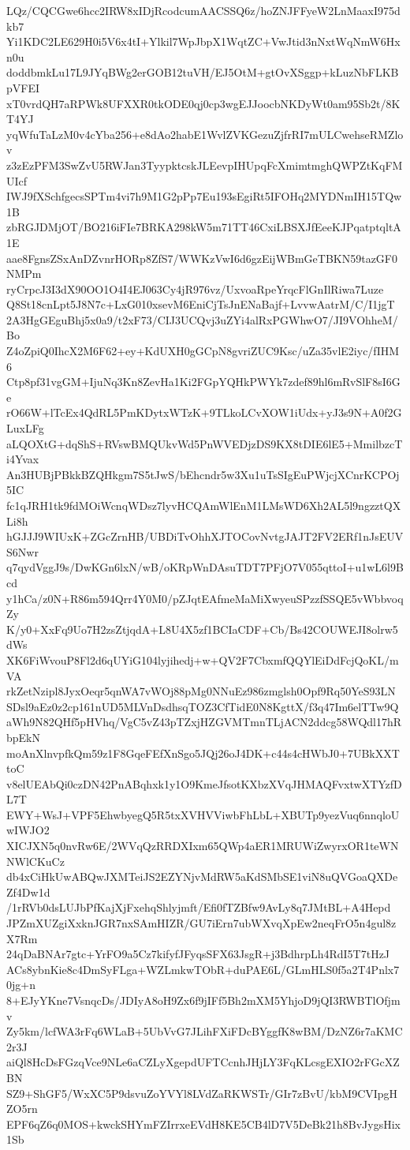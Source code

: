 LQz/CQCGwe6hcc2IRW8xIDjRcodcumAACSSQ6z/hoZNJFFyeW2LnMaaxI975dkb7
Yi1KDC2LE629H0i5V6x4tI+Ylkil7WpJbpX1WqtZC+VwJtid3nNxtWqNmW6Hxn0u
doddbmkLu17L9JYqBWg2erGOB12tuVH/EJ5OtM+gtOvXSggp+kLuzNbFLKBpVFEI
xT0vrdQH7aRPWk8UFXXR0tkODE0qj0cp3wgEJJoocbNKDyWt0am95Sb2t/8KT4YJ
yqWfuTaLzM0v4cYba256+e8dAo2habE1WvlZVKGezuZjfrRI7mULCwehseRMZlov
z3zEzPFM3SwZvU5RWJan3TyypktcskJLEevpIHUpqFcXmimtmghQWPZtKqFMUIcf
IWJ9fXSchfgecsSPTm4vi7h9M1G2pPp7Eu193sEgiRt5IFOHq2MYDNmIH15TQw1B
zbRGJDMjOT/BO216iFIe7BRKA298kW5m71TT46CxiLBSXJfEeeKJPqatptqltA1E
aae8FgnsZSxAnDZvnrHORp8ZfS7/WWKzVwI6d6gzEijWBmGeTBKN59tazGF0NMPm
ryCrpcJ3I3dX90OO1O4I4EJ063Cy4jR976vz/UxvoaRpeYrqcFlGnIlRiwa7Luze
Q8St18cnLpt5J8N7c+LxG010xsevM6EniCjTsJnENaBajf+LvvwAatrM/C/I1jgT
2A3HgGEguBhj5x0a9/t2xF73/CIJ3UCQvj3uZYi4alRxPGWhwO7/JI9VOhheM/Bo
Z4oZpiQ0IhcX2M6F62+ey+KdUXH0gGCpN8gvriZUC9Ksc/uZa35vlE2iyc/fIHM6
Ctp8pf31vgGM+IjuNq3Kn8ZevHa1Ki2FGpYQHkPWYk7zdef89hl6mRvSlF8sI6Ge
rO66W+lTcEx4QdRL5PmKDytxWTzK+9TLkoLCvXOW1iUdx+yJ3s9N+A0f2GLuxLFg
aLQOXtG+dqShS+RVswBMQUkvWd5PnWVEDjzDS9KX8tDIE6lE5+MmilbzcTi4Yvax
An3HUBjPBkkBZQHkgm7S5tJwS/bEhcndr5w3Xu1uTsSIgEuPWjcjXCnrKCPOj5IC
fc1qJRH1tk9fdMOiWcnqWDsz7lyvHCQAmWlEnM1LMsWD6Xh2AL5l9ngzztQXLi8h
hGJJJ9WIUxK+ZGcZrnHB/UBDiTvOhhXJTOCovNvtgJAJT2FV2ERf1nJsEUVS6Nwr
q7qydVggJ9s/DwKGn6lxN/wB/oKRpWnDAsuTDT7PFjO7V055qttoI+u1wL6l9Bcd
y1hCa/z0N+R86m594Qrr4Y0M0/pZJqtEAfmeMaMiXwyeuSPzzfSSQE5vWbbvoqZy
K/y0+XxFq9Uo7H2zsZtjqdA+L8U4X5zf1BCIaCDF+Cb/Bs42COUWEJI8olrw5dWs
XK6FiWvouP8Fl2d6qUYiG104lyjihedj+w+QV2F7CbxmfQQYlEiDdFcjQoKL/mVA
rkZetNzipl8JyxOeqr5qnWA7vWOj88pMg0NNuEz986zmglsh0Opf9Rq50YeS93LN
SDsl9aEz0z2cp161nUD5MLVnDsdhsqTOZ3CfTidE0N8KgttX/f3q47Im6elTTw9Q
aWh9N82QHf5pHVhq/VgC5vZ43pTZxjHZGVMTmnTLjACN2ddcg58WQdl17hRbpEkN
moAnXlnvpfkQm59z1F8GqeFEfXnSgo5JQj26oJ4DK+c44s4cHWbJ0+7UBkXXTtoC
v8elUEAbQi0czDN42PnABqhxk1y1O9KmeJfsotKXbzXVqJHMAQFvxtwXTYzfDL7T
EWY+WsJ+VPF5EhwbyegQ5R5txXVHVViwbFhLbL+XBUTp9yezVuq6nnqloUwIWJO2
XICJXN5q0nvRw6E/2WVqQzRRDXIxm65QWp4aER1MRUWiZwyrxOR1teWNNWlCKuCz
db4xCiHkUwABQwJXMTeiJS2EZYNjvMdRW5aKdSMbSE1viN8uQVGoaQXDeZf4Dw1d
/1rRVb0dsLUJbPfKajXjFxehqShlyjmft/Efi0fTZBfw9AvLy8q7JMtBL+A4Hepd
JPZmXUZgiXxknJGR7nxSAmHIZR/GU7iErn7ubWXvqXpEw2neqFrO5n4gul8zX7Rm
24qDaBNAr7gtc+YrFO9a5Cz7kifyfJFyqsSFX63JsgR+j3BdhrpLh4RdI5T7tHzJ
ACs8ybnKie8c4DmSyFLga+WZLmkwTObR+duPAE6L/GLmHLS0f5a2T4Pnlx70jg+n
8+EJyYKne7VsnqcDs/JDIyA8oH9Zx6f9jIFf5Bh2mXM5YhjoD9jQI3RWBTlOfjmv
Zy5km/lcfWA3rFq6WLaB+5UbVvG7JLihFXiFDcBYggfK8wBM/DzNZ6r7aKMC2r3J
aiQl8HcDsFGzqVce9NLe6aCZLyXgepdUFTCcnhJHjLY3FqKLcsgEXIO2rFGcXZBN
SZ9+ShGF5/WxXC5P9dsvuZoYVYl8LVdZaRKWSTr/GIr7zBvU/kbM9CVIpgHZO5rn
EPF6qZ6q0MOS+kwckSHYmFZIrrxeEVdH8KE5CB4lD7V5DeBk21h8BvJygsHix1Sb
